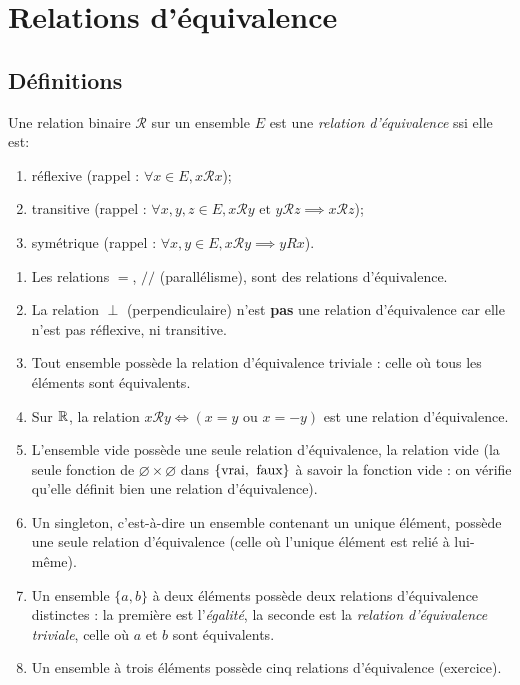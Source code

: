 


\section{Relations d'équivalence}

\subsection{Définitions}

\begin{definition}
Une relation binaire ${\mathcal R}$ sur un ensemble $E$ est une \emph{relation d'équivalence} ssi elle est:
\begin{enumerate}
\item réflexive (rappel : $\forall x\in E, x{\mathcal R}x$);
\item transitive (rappel : $\forall x, y, z\in E, x{\mathcal R}y\text{ et } y{\mathcal R}z \implies x{\mathcal R}z$);
\item symétrique (rappel : $\forall x, y\in E, x{\mathcal R}y \implies yRx$).
\end{enumerate}
\end{definition}

\begin{exemples}
\begin{enumerate}[label=\alph*)]
\item Les relations $=$, $//$ (parallélisme), sont des relations d'équivalence.
\item La relation $\perp$ (perpendiculaire) n'est \textbf{pas} une relation d'équivalence car elle n'est pas réflexive, ni transitive.
\item Tout ensemble possède la relation d'équivalence triviale : celle où tous les éléments sont équivalents.
\item Sur $\mathbb{R}$, la relation $x\mathcal R y \iff \left(x=y\text{ ou }x=-y\right)$ est une relation d'équivalence.
\item L'ensemble vide possède une seule relation d'équivalence, la relation vide (la seule fonction de $\varnothing \times \varnothing$ dans $\{\text{vrai,\: faux}\}$ à savoir la fonction vide : on vérifie qu'elle définit bien une relation d'équivalence).
\item Un singleton, c'est-à-dire un ensemble contenant un unique élément, possède une seule relation d'équivalence (celle où l'unique élément est relié à lui-même).
\item Un ensemble $\{a,b\}$ à deux éléments possède deux relations d'équivalence distinctes : la première est l'\emph{égalité}, la seconde est la \emph{relation d'équivalence triviale}, celle où $a$ et $b$ sont équivalents.
\item Un ensemble à trois éléments possède cinq relations d'équivalence (exercice).
\end{enumerate}
\end{exemples}

